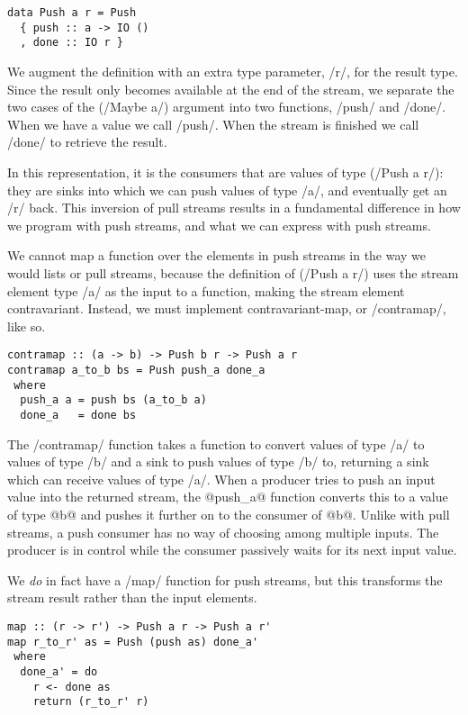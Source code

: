\begin{lstlisting}
data Push a r = Push
  { push :: a -> IO ()
  , done :: IO r }
\end{lstlisting}

We augment the definition with an extra type parameter, \Hs/r/, for the result type.
Since the result only becomes available at the end of the stream, we separate the two cases of the (\Hs/Maybe a/) argument into two functions, \Hs/push/ and \Hs/done/.
When we have a value we call \Hs/push/.
When the stream is finished we call \Hs/done/ to retrieve the result.


In this representation, it is the consumers that are values of type (\Hs/Push a r/): they are sinks into which we can push values of type \Hs/a/, and eventually get an \Hs/r/ back.
This inversion of pull streams results in a fundamental difference in how we program with push streams, and what we can express with push streams.

We cannot map a function over the elements in push streams in the way we would lists or pull streams, because the definition of (\Hs/Push a r/) uses the stream element type \Hs/a/ as the input to a function, making the stream element contravariant.
Instead, we must implement contravariant-map, or \Hs/contramap/, like so.

\begin{lstlisting}
contramap :: (a -> b) -> Push b r -> Push a r
contramap a_to_b bs = Push push_a done_a
 where
  push_a a = push bs (a_to_b a)
  done_a   = done bs
\end{lstlisting}

The \Hs/contramap/ function takes a function to convert values of type \Hs/a/ to values of type \Hs/b/ and a sink to push values of type \Hs/b/ to, returning a sink which can receive values of type \Hs/a/.
When a producer tries to push an input value into the returned stream, the @push_a@ function converts this to a value of type @b@ and pushes it further on to the consumer of @b@.
Unlike with pull streams, a push consumer has no way of choosing among multiple inputs.
The producer is in control while the consumer passively waits for its next input value.

We \emph{do} in fact have a \Hs/map/ function for push streams, but this transforms the stream result rather than the input elements.

\begin{lstlisting}
map :: (r -> r') -> Push a r -> Push a r'
map r_to_r' as = Push (push as) done_a'
 where
  done_a' = do
    r <- done as
    return (r_to_r' r)
\end{lstlisting}

